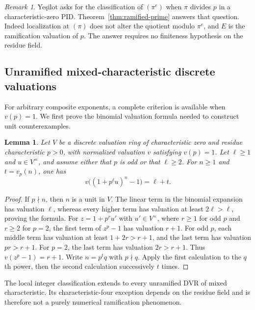 \documentclass[11pt,a4paper]{amsart}
\newtheorem{lemma}[theorem]{Lemma}
\theoremstyle{definition}
\theoremstyle{remark}
\newtheorem{remark}[theorem]{Remark}
\numberwithin{equation}{section}
\begin{document}
\begin{remark}
Ye\c{s}ilot \cite[Remark~5]{Yes} asks for the classification of $(\pi^e)$ when $\pi$ divides
$p$ in a characteristic-zero PID.
Theorem~\ref{thm:ramified-prime} answers that question. Indeed localization
at $(\pi)$ does not alter the quotient modulo $\pi^e$, and $E$ is the
ramification valuation of $p$. The answer requires no finiteness
hypothesis on the residue field.
\end{remark}


\subsection{Unramified mixed-characteristic discrete valuations}

For arbitrary composite exponents, a complete criterion is available when
$v(p)=1$. We first prove the binomial valuation formula needed to
construct unit counterexamples.

\begin{lemma}\label{lem:principal-unit}
Let $V$ be a discrete valuation ring of characteristic zero and residue
characteristic $p>0$, with normalized valuation $v$ satisfying $v(p)=1$.
Let $\ell\ge1$ and $u\in V^\times$, and assume either that $p$ is
odd or that $\ell\ge2$. For $n\ge1$ and $t=v_p(n)$, one has
\[
 v\bigl((1+p^\ell u)^n-1\bigr)=\ell+t.
\]
\end{lemma}
\begin{proof}
If $p\nmid n$, then $n$ is a unit in $V$. The linear term in the
binomial expansion has valuation $\ell$, whereas every higher term
has valuation at least $2\ell>\ell$, proving the formula.
For $z=1+p^ru'$ with $u'\in V^\times$, where $r\ge1$ for odd $p$
and $r\ge2$ for $p=2$, the first term of $z^p-1$ has valuation $r+1$.
For odd $p$, each middle term has valuation at least $1+2r>r+1$,
and the last term has valuation $pr>r+1$. For $p=2$, the last term
has valuation $2r>r+1$. Thus $v(z^p-1)=r+1$.
Write $n=p^tq$ with $p\nmid q$. Apply the first calculation to the
$q$th power, then the second calculation successively $t$ times.
\end{proof}

The local integer classification extends to every unramified DVR of
mixed characteristic. Its characteristic-four exception depends on the
residue field and is therefore not a purely numerical ramification
phenomenon.
\end{document}
